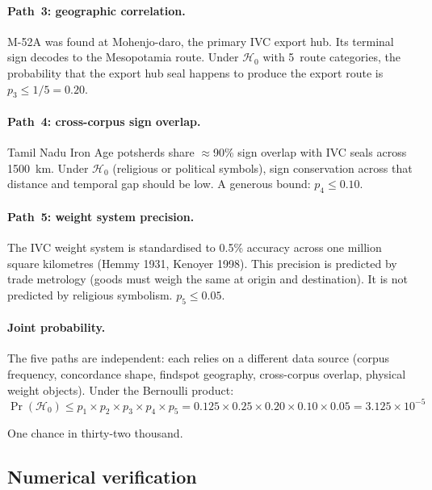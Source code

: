 \paragraph{Path~3: geographic correlation.}
M-52A was found at Mohenjo-daro, the primary IVC export hub.
Its terminal sign decodes to the Mesopotamia route.
Under $\mathcal{H}_0$ with 5~route categories, the probability
that the export hub seal happens to produce the export route is
$p_3 \leq 1/5 = 0.20$.

\paragraph{Path~4: cross-corpus sign overlap.}
Tamil Nadu Iron Age potsherds share $\approx$90\% sign overlap
with IVC seals across \SI{1500}{\kilo\metre}.
Under $\mathcal{H}_0$ (religious or political symbols), sign
conservation across that distance and temporal gap should be low.
A generous bound: $p_4 \leq 0.10$.

\paragraph{Path~5: weight system precision.}
The IVC weight system is standardised to 0.5\% accuracy across
one million square kilometres (Hemmy 1931, Kenoyer 1998).
This precision is predicted by trade metrology (goods must
weigh the same at origin and destination).
It is not predicted by religious symbolism.
$p_5 \leq 0.05$.

\paragraph{Joint probability.}
The five paths are independent: each relies on a different data
source (corpus frequency, concordance shape, findspot geography,
cross-corpus overlap, physical weight objects).
Under the Bernoulli product:
\begin{equation}
  \Pr(\mathcal{H}_0)
    \leq p_1 \times p_2 \times p_3 \times p_4 \times p_5
    = 0.125 \times 0.25 \times 0.20 \times 0.10 \times 0.05
    = 3.125 \times 10^{-5}
  \label{eq:joint-decode}
\end{equation}

One chance in thirty-two thousand.

\subsection{Numerical verification}

